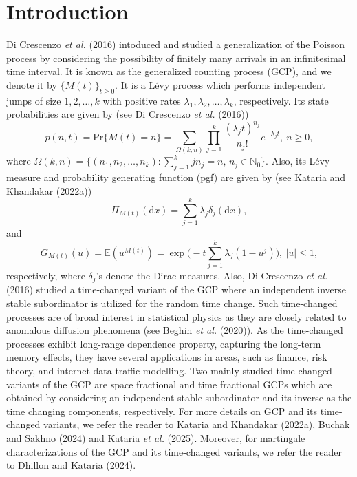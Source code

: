\documentclass[12pt,oneside,reqno]{amsart}
\numberwithin{equation}{section}
\theoremstyle{definition}
\numberwithin{equation}{section}
\theoremstyle{remarkstyle}
\begin{document}
\section{Introduction}
Di Crescenzo {\it{et al.}} (2016) intoduced and studied a generalization of the Poisson process by considering the possibility of finitely many arrivals in an infinitesimal time interval. It is known as the generalized counting process (GCP), and we denote it by $\{M(t)\}_{t\ge 0}$. It is a L\'evy process which performs independent jumps of size $1,2,\dots,k$ with positive rates $\lambda_1,\lambda_2,\dots,\lambda_k$, respectively. Its state probabilities are given by (see Di Crescenzo {\it{et al.}} (2016))
\begin{equation*}
p(n,t)=\mathrm{Pr}\{M(t)=n\}=\sum_{\Omega(k,n)}\prod_{j=1}^{k} \frac{(\lambda_{j}t)^{n_j}}{n_j!}e^{-\lambda_j t}, \ n\ge 0,
\end{equation*}
where $\Omega(k,n)=\big\{(n_1,n_2,\dots,n_k): \sum_{j=1}^{k}jn_j=n,\, n_j\in\mathbb{N}_0\big\}$.
Also, its L\'evy measure and  probability generating function (pgf) are given by (see Kataria and Khandakar (2022a))
\begin{equation*}
\Pi_{M(t)}(\mathrm{d}x)=\sum_{j=1}^{k}\lambda_j \delta_j(\mathrm{d}x),
\end{equation*}
and
\begin{equation}\label{pgf_gcp}
G_{M(t)}(u)=\mathbb{E}(u^{M(t)})=\exp\Big(-t\sum_{j=1}^{k}\lambda_j (1-u^j)\Big),\ |u|\le 1,
\end{equation}
respectively, where $\delta_j$'s denote the Dirac measures. Also, Di Crescenzo {\it{et al.}} (2016)  studied a time-changed variant of the GCP where an independent inverse stable subordinator is utilized for the random time change. Such time-changed processes are of broad interest in statistical physics as they are closely related to anomalous diffusion phenomena (see Beghin \textit{et al.} (2020)). As the time-changed processes exhibit long-range dependence property, capturing the long-term memory effects, they have several applications in areas, such as finance, risk theory, and internet data traffic modelling. Two mainly studied time-changed variants of the GCP are space fractional and time fractional GCPs which are obtained by considering an independent stable subordinator and its inverse as the time changing components, respectively. For more details on GCP and its time-changed variants, we refer the reader to Kataria and Khandakar (2022a), Buchak and Sakhno (2024) and Kataria {\it et al.} (2025). Moreover,
for martingale characterizations of the GCP and its time-changed variants, we refer the reader to Dhillon and Kataria (2024).
\end{document}
